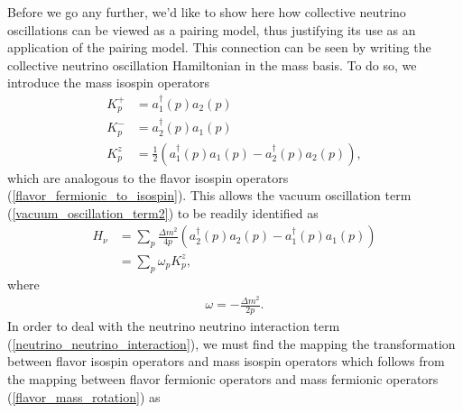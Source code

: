 \documentclass[10pt]{article}
\begin{document}
Before we go any further, we'd like to show here how collective neutrino oscillations can be viewed as a pairing model, thus justifying its use as an application of the pairing model. This connection can be seen by writing the collective neutrino oscillation Hamiltonian in the mass basis. To do so, we introduce the
mass isospin operators
\begin{align}
K^+_p&=a^\dagger_1(p)a_2(p)
\\
K^-_p&=a^\dagger_2(p)a_1(p)
\\
K^z_p&=\frac{1}{2}\left(a^\dagger_1(p)a_1(p)-a^\dagger_2(p)a_2(p)\right)
,\end{align}
which are analogous to the flavor isospin operators (\ref{flavor_fermionic_to_isospin}). This allows the vacuum oscillation term (\ref{vacuum_oscillation_term2}) to be readily identified as
\begin{align}
\label{vacuum_oscillation_term_k}
H_\nu 
&= 
\sum_p\frac{\Delta m^2}{4p}\left(a^\dagger_2(p)a_2(p)-a^\dagger_1(p)a_1(p)\right)
\nonumber
\\
&=
\sum_p\omega_pK^z_p
,\end{align}
where
\begin{align}
\omega=-\frac{\Delta m^2}{2p}
.\end{align}
In order to deal with the neutrino neutrino interaction term (\ref{neutrino_neutrino_interaction}), we must find the mapping the transformation between flavor isospin operators and mass isospin operators which follows from the mapping between flavor fermionic operators and mass fermionic operators (\ref{flavor_mass_rotation}) as
\end{document}
